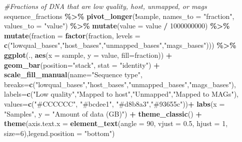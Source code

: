 \documentclass[
]{book}
\newenvironment{Shaded}{\begin{snugshade}}{\end{snugshade}}
\newcommand{\AttributeTok}[1]{\textcolor[rgb]{0.13,0.29,0.53}{#1}}
\newcommand{\CommentTok}[1]{\textcolor[rgb]{0.56,0.35,0.01}{\textit{#1}}}
\newcommand{\DecValTok}[1]{\textcolor[rgb]{0.00,0.00,0.81}{#1}}
\newcommand{\FloatTok}[1]{\textcolor[rgb]{0.00,0.00,0.81}{#1}}
\newcommand{\FunctionTok}[1]{\textcolor[rgb]{0.13,0.29,0.53}{\textbf{#1}}}
\newcommand{\NormalTok}[1]{#1}
\newcommand{\SpecialCharTok}[1]{\textcolor[rgb]{0.81,0.36,0.00}{\textbf{#1}}}
\newcommand{\StringTok}[1]{\textcolor[rgb]{0.31,0.60,0.02}{#1}}
\begin{document}
\begin{Shaded}
\begin{Highlighting}[]
\CommentTok{\#Fractions of DNA that are low quality, host, unmapped, or mags}
\NormalTok{sequence\_fractions }\SpecialCharTok{\%\textgreater{}\%}
    \FunctionTok{pivot\_longer}\NormalTok{(}\SpecialCharTok{!}\NormalTok{sample, }\AttributeTok{names\_to =} \StringTok{"fraction"}\NormalTok{, }\AttributeTok{values\_to =} \StringTok{"value"}\NormalTok{) }\SpecialCharTok{\%\textgreater{}\%}
    \FunctionTok{mutate}\NormalTok{(}\AttributeTok{value =}\NormalTok{ value }\SpecialCharTok{/} \DecValTok{1000000000}\NormalTok{) }\SpecialCharTok{\%\textgreater{}\%}
    \FunctionTok{mutate}\NormalTok{(}\AttributeTok{fraction =} \FunctionTok{factor}\NormalTok{(fraction, }\AttributeTok{levels =} \FunctionTok{c}\NormalTok{(}\StringTok{"lowqual\_bases"}\NormalTok{,}\StringTok{"host\_bases"}\NormalTok{,}\StringTok{"unmapped\_bases"}\NormalTok{,}\StringTok{"mags\_bases"}\NormalTok{))) }\SpecialCharTok{\%\textgreater{}\%}
    \FunctionTok{ggplot}\NormalTok{(., }\FunctionTok{aes}\NormalTok{(}\AttributeTok{x =}\NormalTok{ sample, }\AttributeTok{y =}\NormalTok{ value, }\AttributeTok{fill=}\NormalTok{fraction)) }\SpecialCharTok{+}
        \FunctionTok{geom\_bar}\NormalTok{(}\AttributeTok{position=}\StringTok{"stack"}\NormalTok{, }\AttributeTok{stat =} \StringTok{"identity"}\NormalTok{) }\SpecialCharTok{+}
      \FunctionTok{scale\_fill\_manual}\NormalTok{(}\AttributeTok{name=}\StringTok{"Sequence type"}\NormalTok{,}
                    \AttributeTok{breaks=}\FunctionTok{c}\NormalTok{(}\StringTok{"lowqual\_bases"}\NormalTok{,}\StringTok{"host\_bases"}\NormalTok{,}\StringTok{"unmapped\_bases"}\NormalTok{,}\StringTok{"mags\_bases"}\NormalTok{),}
                    \AttributeTok{labels=}\FunctionTok{c}\NormalTok{(}\StringTok{"Low quality"}\NormalTok{,}\StringTok{"Mapped to host"}\NormalTok{,}\StringTok{"Unmapped"}\NormalTok{,}\StringTok{"Mapped to MAGs"}\NormalTok{),}
                    \AttributeTok{values=}\FunctionTok{c}\NormalTok{(}\StringTok{"\#CCCCCC"}\NormalTok{, }\StringTok{"\#bcdee1"}\NormalTok{, }\StringTok{"\#d8b8a3"}\NormalTok{,}\StringTok{"\#93655c"}\NormalTok{))}\SpecialCharTok{+}
        \FunctionTok{labs}\NormalTok{(}\AttributeTok{x =} \StringTok{"Samples"}\NormalTok{, }\AttributeTok{y =} \StringTok{"Amount of data (GB)"}\NormalTok{) }\SpecialCharTok{+}
        \FunctionTok{theme\_classic}\NormalTok{() }\SpecialCharTok{+}
        \FunctionTok{theme}\NormalTok{(}\AttributeTok{axis.text.x =} \FunctionTok{element\_text}\NormalTok{(}\AttributeTok{angle =} \DecValTok{90}\NormalTok{, }\AttributeTok{vjust =} \FloatTok{0.5}\NormalTok{, }\AttributeTok{hjust =} \DecValTok{1}\NormalTok{, }\AttributeTok{size=}\DecValTok{6}\NormalTok{),}\AttributeTok{legend.position =} \StringTok{"bottom"}\NormalTok{)}
\end{Highlighting}
\end{Shaded}
\end{document}

